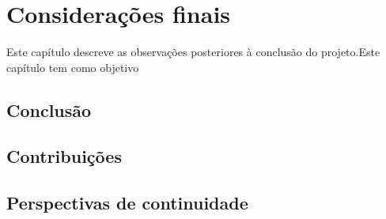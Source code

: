 \chapter{Considerações finais}
\label{CAP6}


Este capítulo descreve as observações posteriores à conclusão do projeto.Este capítulo tem como objetivo 


\section{Conclusão}

\section{Contribuições}

\section{Perspectivas de continuidade}

